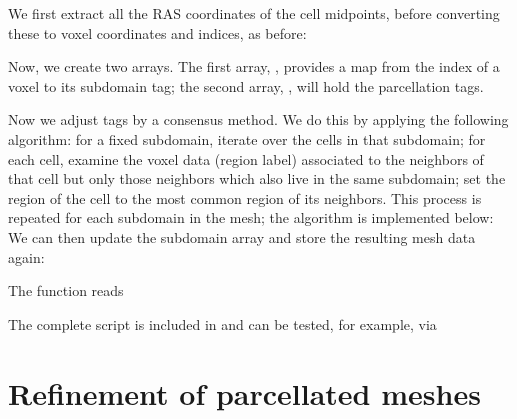 We first extract all the RAS coordinates of the cell midpoints,
before converting these to voxel coordinates and indices, as before:

Now, we create two arrays.  The first array, , provides 
a map from the index of a voxel to its subdomain tag;  the second array, 
, will hold the parcellation tags. 

Now we adjust tags by a consensus method.  We do this by applying the following 
algorithm: for a fixed subdomain, iterate over the cells in that subdomain; 
for each cell, examine the voxel data (region label) associated to the neighbors 
of that cell but only those neighbors which also live in the same subdomain; set 
the region of the cell to the most common region of its neighbors.  This 
process is repeated for each subdomain in the mesh; the algorithm is 
implemented below: 
%
We can then update the subdomain array
and store the resulting mesh data again:

The  function reads 

The complete script is included in
 and can be tested, for example, via 

\section{Refinement of parcellated meshes}
\label{sec:chp4:addparcellations}

